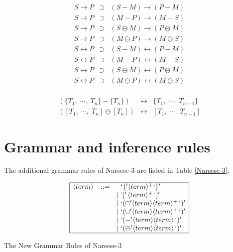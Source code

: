 \begin{theo}
\[\begin{array}{rcl}
S \rightarrow P & \supset & (S - M) \rightarrow (P - M) \\
S \rightarrow P & \supset & (M - P) \rightarrow (M - S) \\
S \rightarrow P & \supset & (S \ominus M) \rightarrow (P \ominus M) \\
S \rightarrow P & \supset & (M \ominus P) \rightarrow (M \ominus S) \\
S \leftrightarrow P & \supset & (S - M) \leftrightarrow (P - M) \\
S \leftrightarrow P & \supset & (M - P) \leftrightarrow (M - S) \\
S \leftrightarrow P & \supset & (S \ominus M) \leftrightarrow (P \ominus M) \\
S \leftrightarrow P & \supset & (M \ominus P) \leftrightarrow (M \ominus S) \\
\end{array}\]
\end{theo}

\begin{theo}
\[\begin{array}{ccc}
(\{T_1, \; \cdots , \; T_n\} - \{T_n\}) & \leftrightarrow & \{T_1, \; \cdots , \; T_{n-1}\} \\
([T_1, \; \cdots , \; T_n] \ominus [T_n]) & \leftrightarrow & [T_1, \; \cdots , \; T_{n-1}]
\end{array}\] 
\end{theo}

\section{Grammar and inference rules}

The additional grammar rules of Narsese-3 are listed in Table \ref{Narsese-3}.

\begin{table}[htb]
\[\begin{array}{|rrl|}
\hline
\langle  term \rangle  & ::= & \;\; `\{' \langle term \rangle ^+ `\}' \\ &&
                  		 | \; `[' \, \langle term \rangle ^+ \, `]' \\ &&
                  		 | \; `( \, \!\cap' \langle  term \rangle  \langle  term \rangle ^+ \, `)' \\ &&
                  		 | \; `( \, \!\cup' \langle  term \rangle  \langle  term \rangle ^+ \, `)' \\ &&
               	  		 | \; `( \, \!-' \langle  term \rangle  \langle  term \rangle \, `)'\\ &&
                  		 | \; `( \, \!\ominus' \langle term \rangle \langle term \rangle \, `)' \\
\hline
\end{array} \]
\caption{The New Grammar Rules of Narsese-3}
\label{Narsese-3}
\end{table}

